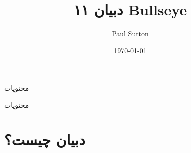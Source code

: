 \documentclass[hyperref={colorlinks}]{beamer}
\title[Short title]{دبیان ۱۱ Bullseye} %
\author{Paul Sutton} %
\institute[Debian] %
{
	http://www.debian.org \\ %
	
	\medskip
	\textit{paulsutton@disroot.org } %
}
\date{\today} %
\begin{document}
\begin{persian}
	\begin{frame}
	\titlepage %
	\end{frame}
\end{persian}

\begin{persian}

\begin{frame}{محتویات}
\begin{block}{محتویات}
	\begin{multicols}{2}
		\setcounter{tocdepth}{2}
		\tableofcontents %
	\end{multicols}
\end{block}
\end{frame}
\end{persian}


\section{دبیان چیست؟} %


\end{document}
